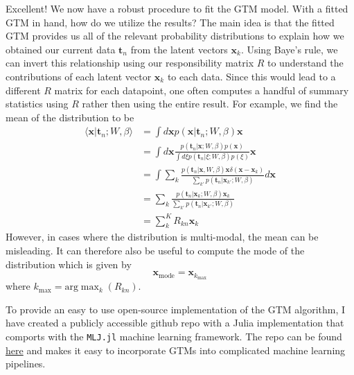 Excellent! We now have a robust procedure to fit the GTM model. With a fitted GTM in hand, how do we utilize the results? The main idea is that the fitted GTM provides us all of the relevant probability distributions to explain how we obtained our current data $\mathbf{t}_n$ from the latent vectors $\mathbf{x}_k$. Using Baye's rule, we can invert this relationship using our responsibility matrix $R$ to understand the contributions of each latent vector $\mathbf{x}_k$ to each data. Since this would lead to a different $R$ matrix for each datapoint, one often computes a handful of summary statistics using $R$ rather then using the entire result. For example, we find the mean of the distribution to be
\begin{equation}
  \begin{aligned}
    \langle \mathbf{x} \vert \mathbf{t}_n; W,\beta\rangle &= \int d\mathbf{x} p(\mathbf{x}\vert\mathbf{t}_n;W,\beta)\mathbf{x} \\
    &= \int d\mathbf{x}\frac{p(\mathbf{t}_n\vert\mathbf{x};W,\beta)p(\mathbf{x})}{\int d\xi p(\mathbf{t}_n\vert \xi; W,\beta)p(\xi)}\mathbf{x} \\
    &= \int \sum_k \frac{p(\mathbf{t}_n\vert \mathbf{x},W,\beta)\mathbf{x}\delta(\mathbf{x}-\mathbf{x}_k)}{\sum_{k'}p(\mathbf{t}_n\vert\mathbf{x}_{k'};W,\beta)} d\mathbf{x}  \\
    &= \sum_k \frac{p(\mathbf{t}_n\vert \mathbf{x}_k; W, \beta)\mathbf{x}_k}{\sum_{k'}p(\mathbf{t}_n\vert\mathbf{x}_{k'};W,\beta)} \\
    &= \sum_k^K R_{kn}\mathbf{x}_k
  \end{aligned}
\end{equation}
However, in cases where the distribution is multi-modal, the mean can be misleading. It can therefore also be useful to compute the mode of the distribution which is given by
\begin{equation}
  \mathbf{x}_{\text{mode}} = \mathbf{x}_{k_\text{max}}
\end{equation}
where $k_{\text{max}} = \text{arg}\max_{k}(R_{kn})$.

To provide an easy to use open-source implementation of the GTM algorithm, I have created a publicly accessible github repo with a Julia implementation that comports with the \texttt{MLJ.jl} machine learning framework. The repo can be found \href{https://github.com/john-waczak/GenerativeTopographicMapping.jl/tree/main}{here} and makes it easy to incorporate GTMs into complicated machine learning pipelines.

